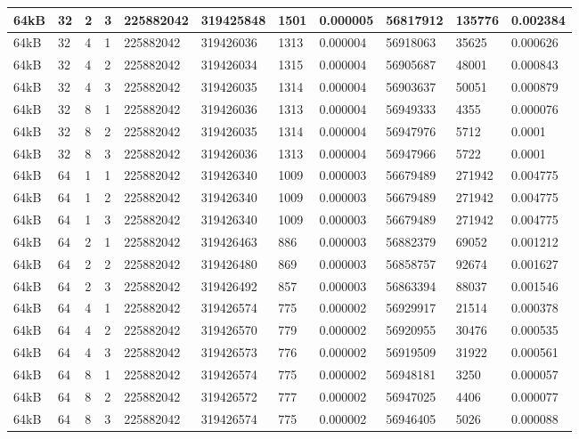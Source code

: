 \documentclass[conference]{IEEEtran}
\begin{document}
\begin{table}
\begin{tabular}{|m{.75cm} |m{.75cm} |m{.8cm} | m{.75cm} | l | l | l | l | l | l | l |}
64kB&	32&	2&	3&	225882042&	319425848&	1501  &	0.000005  &	56817912  &	135776	&0.002384 \\ \hline
64kB&	32&	4&	1&	225882042&	319426036&	1313  &	0.000004  &	56918063  &	35625	  &0.000626 \\ \hline
64kB&	32&	4&	2&	225882042&	319426034&	1315  &	0.000004  &	56905687  &	48001	  &0.000843 \\ \hline
64kB&	32&	4&	3&	225882042&	319426035&	1314  &	0.000004  &	56903637  &	50051	  &0.000879 \\ \hline
64kB&	32&	8&	1&	225882042&	319426036&	1313  &	0.000004  &	56949333  &	4355	  &0.000076 \\ \hline
64kB&	32&	8&	2&	225882042&	319426035&	1314  &	0.000004  &	56947976  &	5712	  &0.0001 \\ \hline
64kB&	32&	8&	3&	225882042&	319426036&	1313  &	0.000004  &	56947966  &	5722	  &0.0001 \\ \hline
64kB&	64&	1&	1&	225882042&	319426340&	1009  &	0.000003  &	56679489  &	271942	&0.004775 \\ \hline
64kB&	64&	1&	2&	225882042&	319426340&	1009  &	0.000003  &	56679489  &	271942	&0.004775 \\ \hline
64kB&	64&	1&	3&	225882042&	319426340&	1009  &	0.000003  &	56679489  &	271942	&0.004775 \\ \hline
64kB&	64&	2&	1&	225882042&	319426463&	886	  &0.000003	  &56882379	  &69052	  &0.001212 \\ \hline
64kB&	64&	2&	2&	225882042&	319426480&	869	  &0.000003	  &56858757	  &92674	  &0.001627 \\ \hline
64kB&	64&	2&	3&	225882042&	319426492&	857	  &0.000003	  &56863394	  &88037	  &0.001546 \\ \hline
64kB&	64&	4&	1&	225882042&	319426574&	775	  &0.000002	  &56929917	  &21514	  &0.000378 \\ \hline
64kB&	64&	4&	2&	225882042&	319426570&	779	  &0.000002	  &56920955	  &30476	  &0.000535 \\ \hline
64kB&	64&	4&	3&	225882042&	319426573&	776	  &0.000002	  &56919509	  &31922	  &0.000561 \\ \hline
64kB&	64&	8&	1&	225882042&	319426574&	775	  &0.000002	  &56948181	  &3250	    &0.000057 \\ \hline
64kB&	64&	8&	2&	225882042&	319426572&	777	  &0.000002	  &56947025	  &4406	    &0.000077 \\ \hline
64kB&	64&	8&	3&	225882042&	319426574&	775	  &0.000002	  &56946405	  &5026	    &0.000088 \\ \hline
    \end{tabular}
  \end{table}

  
  
\end{document}
